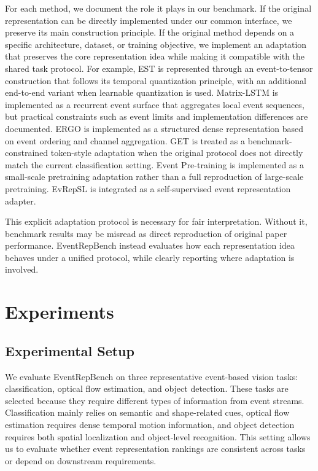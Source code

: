 \documentclass[letterpaper]{article}
\begin{document}
For each method, we document the role it plays in our benchmark. If the original representation can be directly implemented under our common interface, we preserve its main construction principle. If the original method depends on a specific architecture, dataset, or training objective, we implement an adaptation that preserves the core representation idea while making it compatible with the shared task protocol. For example, EST is represented through an event-to-tensor construction that follows its temporal quantization principle, with an additional end-to-end variant when learnable quantization is used. Matrix-LSTM is implemented as a recurrent event surface that aggregates local event sequences, but practical constraints such as event limits and implementation differences are documented. ERGO is implemented as a structured dense representation based on event ordering and channel aggregation. GET is treated as a benchmark-constrained token-style adaptation when the original protocol does not directly match the current classification setting. Event Pre-training is implemented as a small-scale pretraining adaptation rather than a full reproduction of large-scale pretraining. EvRepSL is integrated as a self-supervised event representation adapter.

This explicit adaptation protocol is necessary for fair interpretation. Without it, benchmark results may be misread as direct reproduction of original paper performance. EventRepBench instead evaluates how each representation idea behaves under a unified protocol, while clearly reporting where adaptation is involved.

\section{Experiments}
\subsection{Experimental Setup}
We evaluate EventRepBench on three representative event-based vision tasks: classification, optical flow estimation, and object detection. These tasks are selected because they require different types of information from event streams. Classification mainly relies on semantic and shape-related cues, optical flow estimation requires dense temporal motion information, and object detection requires both spatial localization and object-level recognition. This setting allows us to evaluate whether event representation rankings are consistent across tasks or depend on downstream requirements.
\end{document}
